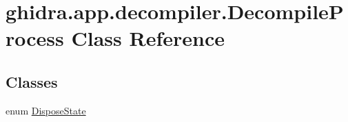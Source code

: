 \hypertarget{classghidra_1_1app_1_1decompiler_1_1_decompile_process}{}\section{ghidra.\+app.\+decompiler.\+Decompile\+Process Class Reference}
\label{classghidra_1_1app_1_1decompiler_1_1_decompile_process}
\subsection*{Classes}
\begin{DoxyCompactItemize}
\item 
enum \mbox{\hyperlink{enumghidra_1_1app_1_1decompiler_1_1_decompile_process_1_1_dispose_state}{Dispose\+State}}
\end{DoxyCompactItemize}
